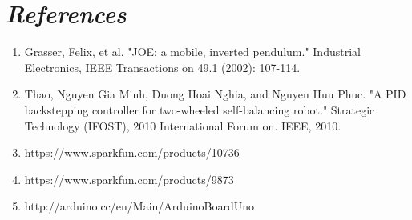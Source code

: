 \documentclass[a4paper , 12pt]{article}
\begin{document}
\pagebreak
\section{\textit{References}}
\begin{enumerate}
\item Grasser, Felix, et al. "JOE: a mobile, inverted pendulum." Industrial Electronics, IEEE Transactions on 49.1 (2002): 107-114.
\item Thao, Nguyen Gia Minh, Duong Hoai Nghia, and Nguyen Huu Phuc. "A PID backstepping controller for two-wheeled self-balancing robot." Strategic Technology (IFOST), 2010 International Forum on. IEEE, 2010.
\item https://www.sparkfun.com/products/10736
\item https://www.sparkfun.com/products/9873        
\item http://arduino.cc/en/Main/ArduinoBoardUno
 
\end{enumerate}
\end{document}
